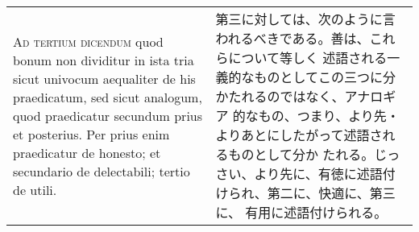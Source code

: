 \documentclass[10pt]{jsarticle}
\begin{document}
\begin{longtable}{p{21em}p{21em}}
\\

{\scshape Ad tertium dicendum} quod bonum non dividitur in ista tria sicut
 univocum aequaliter de his praedicatum, sed sicut analogum, quod
 praedicatur secundum prius et posterius. Per prius enim praedicatur de
 honesto; et secundario de delectabili; tertio de utili.

&


第三に対しては、次のように言われるべきである。善は、これらについて等しく
 述語される一義的なものとしてこの三つに分かたれるのではなく、アナロギア
 的なもの、つまり、より先・よりあとにしたがって述語されるものとして分か
 たれる。じっさい、より先に、有徳に述語付けられ、第二に、快適に、第三に、
 有用に述語付けられる。



\end{longtable}
\end{document}
